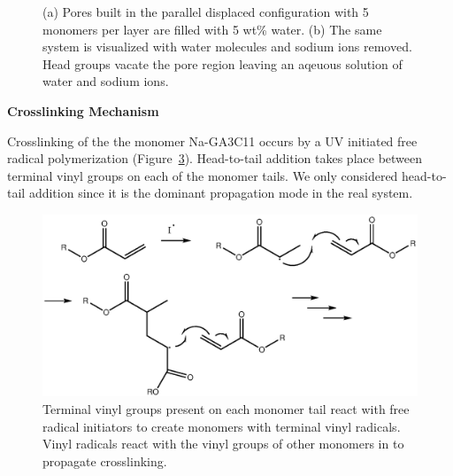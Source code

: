 \documentclass{article}
\begin{document}
\begin{figure}
\begin{subfigure}{0.45\textwidth}
                \caption{}\label{fig:water_removed}
        \end{subfigure}
  \caption{(a) Pores built in the parallel displaced configuration with 5
	  monomers per layer are filled with 5 wt\% water. (b) The same system is
	  visualized with water molecules and sodium ions removed. Head groups vacate the
	  pore region leaving an aqeuous solution of water and sodium ions.}\label{fig:water_pores}
  \end{figure}

  \noindent
  \begingroup
        \fontsize{14pt}{14pt}\selectfont
        \textbf{Crosslinking Mechanism}
  \endgroup

  Crosslinking of the the monomer Na-GA3C11 occurs by a UV initiated free
  radical polymerization (Figure~\ref{fig:xlink_mech}).  Head-to-tail addition
  takes place between terminal vinyl groups on each of the monomer tails.  We
  only considered head-to-tail addition since it is the dominant propagation mode
  in the real system.   

  \begin{figure}
  \centering
  \includegraphics[width=\textwidth]{Crosslink_mechanism.eps}
  \caption{Terminal vinyl groups present on each monomer tail react with free
	  radical initiators to create monomers with terminal vinyl radicals.  Vinyl
	  radicals react with the vinyl groups of other monomers in to propagate
	  crosslinking.}\label{fig:xlink_mech}
  \end{figure}

\clearpage

\end{document}

